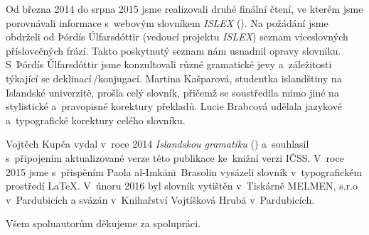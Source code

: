 Od března 2014 do srpna 2015 jsme realizovali druhé finální čtení, ve kterém jsme porovnávali informace s~webovým slovníkem \textit{ISLEX} (\cite {int1}). 
Na požádání jsme obdrželi od Þórdís Úlfarsdóttir (vedoucí projektu \textit{ISLEX}) seznam víceslovných příslovečných frází. Takto poskytnutý seznam nám usnadnil opravy slovníku. 
S~Þórdís Úlfarsdóttir jsme konzultovali různé gramatické jevy a~záležitosti týkající se deklinací\,/\addthin konjugací.
Martina Kašparová, studentka islandštiny na Islandské univerzitě, prošla celý slovník, přičemž se soustředila mimo jiné na stylistické a~pravopisné korektury překladů. 
Lucie Brabcová udělala jazykové a~typografické korektury celého slovníku.

Vojtěch Kupča vydal v~roce 2014 \textit{Islandskou gramatiku} (\cite {is77}) a~souhlasil s~připojením aktualizované verze této publikace ke~knižní verzi IČSS.
V~roce 2015 jsme s~přispěním Paola al-Imk\=an\=\i\ Brasolin vysázeli slovník v~typografickém prostředí {\LaTeX}. V~únoru 2016 byl slovník vytištěn v~Tiskárně MELMEN, s.r.o v~Pardubicích a svázán 
v~Knihařství Vojtíšková Hrubá v~Pardubicích. 

\blspace[5]

{\centering Všem spoluautorům děkujeme za spolupráci.\par}
